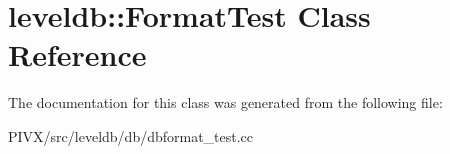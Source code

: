 \hypertarget{classleveldb_1_1_format_test}{}\section{leveldb\+:\+:Format\+Test Class Reference}
\label{classleveldb_1_1_format_test}


The documentation for this class was generated from the following file\+:\begin{DoxyCompactItemize}
\item 
P\+I\+V\+X/src/leveldb/db/dbformat\+\_\+test.\+cc\end{DoxyCompactItemize}
